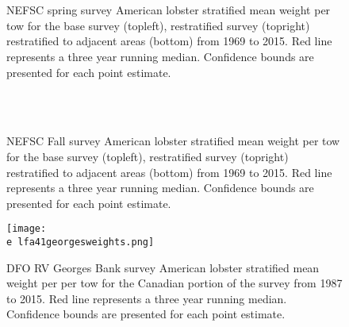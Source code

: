 \documentclass[11pt]{article}
\newcommand{\e}{/backup/bio_data/bio.lobster/figures/} %
\begin{document}
\begin{figure}
\centering
{}
\\
\\

\caption{NEFSC spring survey American lobster stratified mean weight per tow for the base survey (topleft), restratified survey (topright) restratified to adjacent areas (bottom) from 1969 to 2015. Red line represents a three year running median. Confidence bounds are presented for each point estimate. }
\end{figure}
\clearpage



\begin{figure}
\centering
{}
\\
\\

\caption{NEFSC Fall survey American lobster stratified mean weight per tow for the base survey (topleft), restratified survey (topright) restratified to adjacent areas (bottom) from 1969 to 2015. Red line represents a three year running median. Confidence bounds are presented for each point estimate. }
\end{figure}
\clearpage


\begin{figure}

    \texttt{[image: \\e lfa41georgesweights.png]}
    \caption{DFO RV Georges Bank survey American lobster stratified mean weight per per tow for the Canadian portion of the survey from 1987 to 2015. Red line represents a three year running median. Confidence bounds are presented for each point estimate.}

\end{figure}
\end{document}
